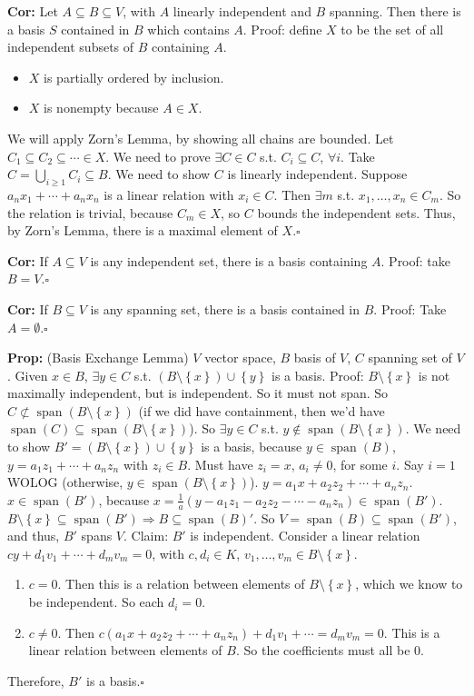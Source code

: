 \documentclass[10pt,letterpaper]{article}
\newcommand{\n}{\hfill\break}
\newcommand{\up}{\vspace{-\baselineskip}}
\newcommand{\hangblock}[2]{\par\noindent\settowidth{\hangindent}{\textbf{#1: }}\textbf{#1: }\!\!\!#2}
\newcommand{\cor}[1]{\hangblock{Cor}{#1}}
\newcommand{\prop}[1]{\hangblock{Prop}{#1}}
\newcommand{\proven}{\;$\square$\n}
\newcommand{\set}[1]{\left\{#1\right\}}
\newcommand{\cut}{\setminus}
\DeclareMathOperator{\vspan}{span}
\newcommand{\st}{s.t.}
\begin{document}
\cor{
	Let $A\subseteq{}B\subseteq{}V$, with $A$ linearly independent and $B$ spanning. Then there is a basis $S$ contained in $B$ which contains $A$.\n
	Proof: define $X$ to be the set of all independent subsets of $B$ containing $A$.
	\begin{itemize}
		\item $X$ is partially ordered by inclusion.
		\item $X$ is nonempty because $A\in{}X$.
	\end{itemize}\up\n
	We will apply Zorn's Lemma, by showing all chains are bounded. Let $C_{1}\subseteq{}C_{2}\subseteq\cdots\in{}X$. We need to prove $\exists{}C\in{}C$ \st{} $C_{i}\subseteq{}C$, $\forall{}i$.\n
	Take $C=\bigcup_{i\ge{}1}C_{i}\subseteq{}B$. We need to show $C$ is linearly independent. Suppose $a_{n}x_{1}+\cdots+a_{n}x_{n}$ is a linear relation with $x_{i}\in{}C$. Then $\exists{}m$ \st{} $x_{1},\ldots,x_{n}\in{}C_{m}$. So the relation is trivial, because $C_{m}\in{}X$, so $C$ bounds the independent sets.\n
	Thus, by Zorn's Lemma, there is a maximal element of $X$.\proven
}

\cor{
	If $A\subseteq{}V$ is any independent set, there is a basis containing $A$.\n
	Proof: take $B=V$.\proven
}

\cor{
	If $B\subseteq{}V$ is any spanning set, there is a basis contained in $B$.\n
	Proof: Take $A=\emptyset$.\proven
}

\prop{
	(Basis Exchange Lemma) $V$ vector space, $B$ basis of $V$, $C$ spanning set of $V$. Given $x\in{}B$, $\exists{}y\in{}C$ \st{} $(B\cut\set{x})\cup\set{y}$ is a basis.\n
	Proof: $B\cut\set{x}$ is not maximally independent, but is independent. So it must not span.\n
	So $C\not\subset\vspan(B\cut\set{x})$ (if we did have containment, then we'd have $\vspan(C)\subseteq\vspan(B\cut\set{x})$). So $\exists{}y\in{}C$ \st{} $y\not\in\vspan(B\cut\set{x})$. We need to show $B'=(B\cut\set{x})\cup\set{y}$ is a basis, because $y\in\vspan(B)$, $y=a_{1}z_{1}+\cdots+a_{n}z_{n}$ with $z_{i}\in{}B$.\n
	\n
	Must have $z_{i}=x$, $a_{i}\ne{}0$, for some $i$. Say $i=1$ WOLOG (otherwise, $y\in\vspan(B\cut\set{x})$). $y=a_{1}x+a_{2}z_{2}+\cdots+a_{n}z_{n}$. $x\in\vspan(B')$, because $x=\frac{1}{a}(y-a_{1}z_{1}-a_{2}z_{2}-\cdots-a_{n}z_{n})\in\vspan(B')$.\n
	\n
	$B\cut\set{x}\subseteq\vspan(B')\Rightarrow{}B\subseteq\vspan(B)'$. So $V=\vspan(B)\subseteq\vspan(B')$, and thus, $B'$ spans $V$.\n
	\n
	Claim: $B'$ is independent. Consider a linear relation $cy+d_{1}v_{1}+\cdots+d_{m}v_{m}=0$, with $c,d_{i}\in{}K$, $v_{1},\ldots,v_{m}\in{}B\cut\set{x}$.
	\begin{enumerate}[label=Case{\arabic*}: ,leftmargin=5\parindent]
		\item $c=0$. Then this is a relation between elements of $B\cut\set{x}$, which we know to be independent. So each $d_{i}=0$.
		\item $c\ne{}0$. Then $c(a_{1}x+a_{2}z_{2}+\cdots+a_{n}z_{n})+d_{1}v_{1}+\cdots=d_{m}v_{m}=0$. This is a linear relation between elements of $B$. So the coefficients must all be $0$.
	\end{enumerate}\up\n
	Therefore, $B'$ is a basis.\proven
}
\end{document}
